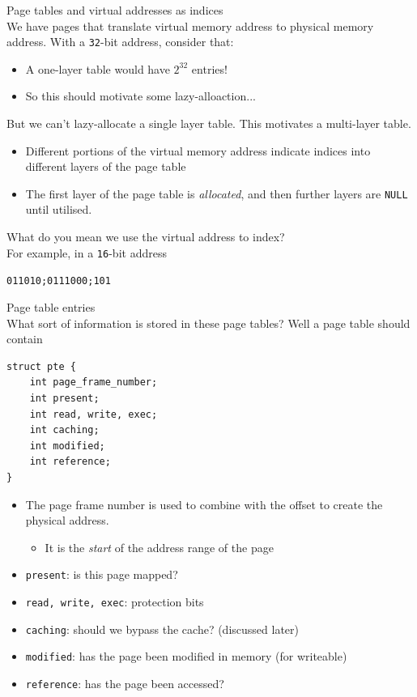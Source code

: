 \documentclass[journal, letterpaper]{IEEEtran}
\begin{document}
\begin{theory}{Page tables and virtual addresses as indices} \\
    We have pages that translate virtual memory address to physical memory address. With a \verb|32|-bit address, consider that:
    \begin{itemize}
        \item A one-layer table would have $2^{32}$ entries!
        \item So this should motivate some lazy-alloaction...
    \end{itemize}
    But we can't lazy-allocate a single layer table. This motivates a multi-layer table.
    \begin{itemize}
        \item Different portions of the virtual memory address indicate indices into different layers of the page table
        \item The first layer of the page table is \textit{allocated}, and then further layers are \verb|NULL| until utilised.
    \end{itemize}
    \begin{aside}{What do you mean we use the virtual address to index?} \\
        For example, in a \verb|16|-bit address 
        \begin{center}
            \verb|011010;0111000;101|
        \end{center}
        
    \end{aside}
\end{theory}
\begin{aside}{Page table entries} \\
    What sort of information is stored in these page tables? Well a page table should contain
\begin{verbatim}
struct pte {
    int page_frame_number;
    int present;
    int read, write, exec;
    int caching;
    int modified;
    int reference;
}
\end{verbatim}
\begin{itemize}
    \item The page frame number is used to combine with the offset to create the physical address.
    \begin{itemize}
        \item It is the \textit{start} of the address range of the page
    \end{itemize}
    \item \verb|present|: is this page mapped?
    \item \verb|read, write, exec|: protection bits
    \item \verb|caching|: should we bypass the cache? (discussed later)
    \item \verb|modified|: has the page been modified in memory (for writeable)
    \item \verb|reference|: has the page been accessed?
\end{itemize}
\end{aside}
\end{document}
